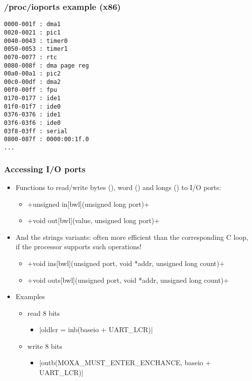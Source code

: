 \begin{frame}[fragile]
  \frametitle{/proc/ioports example (x86)}
{\small
\begin{verbatim}
0000-001f : dma1
0020-0021 : pic1
0040-0043 : timer0
0050-0053 : timer1
0070-0077 : rtc
0080-008f : dma page reg
00a0-00a1 : pic2
00c0-00df : dma2
00f0-00ff : fpu
0170-0177 : ide1
01f0-01f7 : ide0
0376-0376 : ide1
03f6-03f6 : ide0
03f8-03ff : serial
0800-087f : 0000:00:1f.0
...
\end{verbatim}
}
\end{frame}

\begin{frame}[fragile]
  \frametitle{Accessing I/O ports}
  \begin{itemize}
  \item Functions to read/write bytes (), word () and longs () to I/O ports:
    \begin{itemize}
    \item {}+unsigned in[bwl](unsigned long port)+
    \item {}+void out[bwl](value, unsigned long port)+
    \end{itemize}
  \item And the strings variants: often more efficient than the
    corresponding C loop, if the processor supports such operations!
    \begin{itemize}
    \item {}+void ins[bwl](unsigned port, void *addr, unsigned long count)+
    \item {}+void outs[bwl](unsigned port, void *addr, unsigned long count)+
    \end{itemize}
  \item Examples
    \begin{itemize}
    \item read 8 bits
      \begin{itemize}
      \item {}|oldlcr = inb(baseio + UART_LCR)|
      \end{itemize}
    \item write 8 bits
      \begin{itemize}
      \item {}|outb(MOXA_MUST_ENTER_ENCHANCE, baseio + UART_LCR)|
      \end{itemize}
    \end{itemize}
  \end{itemize}
\end{frame}

